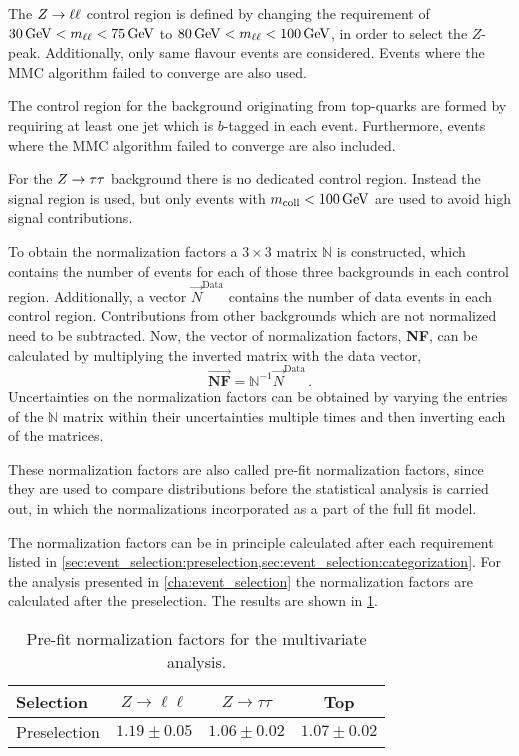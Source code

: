 The $Z \to \ell \ell$ control region is defined by changing the requirement of $\SI{30}{\GeV} < \mll < \SI{75}{\GeV}$ to $\SI{80}{\GeV} < \mll < \SI{100}{\GeV}$, in order to
select the $Z$-peak. Additionally, only same flavour events are considered.
Events where the MMC algorithm failed to converge are also used.

The control region for the background originating from top-quarks are formed by requiring at least one jet which is $b$-tagged in each event.
Furthermore, events where the MMC algorithm failed to converge are also included.

For the $Z \to \tau \tau$ background there is no dedicated control region.
Instead the signal region is used, but only events with $\mcoll < \SI{100}{\GeV}$ are used to avoid high signal contributions.

To obtain the normalization factors a $3 \times 3$ matrix $\mathbb{N}$ is constructed, which contains the number of events for each of those three backgrounds
in each control region.
Additionally, a vector $\vec{N}^\text{Data}$ contains the number of data events in each control region.
Contributions from other backgrounds which are not normalized need to be subtracted.
Now, the vector of normalization factors, \textbf{NF}, can be calculated by multiplying the inverted matrix with the data vector,
\begin{equation}
    \vec{\textbf{NF}} = \mathbb{N}^{-1} \vec{N}^\text{Data} \,.
\end{equation}
Uncertainties on the normalization factors can be obtained by varying the entries of the $\mathbb{N}$ matrix within their uncertainties multiple times and then
inverting each of the matrices.

These normalization factors are also called pre-fit normalization factors, since they are used to compare distributions
before the statistical analysis is carried out, in which the normalizations incorporated as a part of the full fit model.


The normalization factors can be in principle calculated after each requirement listed in \cref{sec:event_selection:preselection,sec:event_selection:categorization}.
For the analysis presented in \cref{cha:event_selection} the normalization factors are calculated after the preselection.
The results are shown in \cref{tab:background_estimation:nfs}.

\begin{table}[htpb]
    \centering
    \caption{Pre-fit normalization factors for the multivariate analysis.}\label{tab:background_estimation:nfs}
    \begin{tabular}{lccc}
        \toprule
        Selection        & $Z \to \ell\ell$ & $Z \to \tau\tau$ & Top \\ \midrule
        Preselection    & $1.19 \pm 0.05$ & $1.06 \pm 0.02$ & $1.07 \pm 0.02$ \\
        \bottomrule
    \end{tabular}
\end{table}

